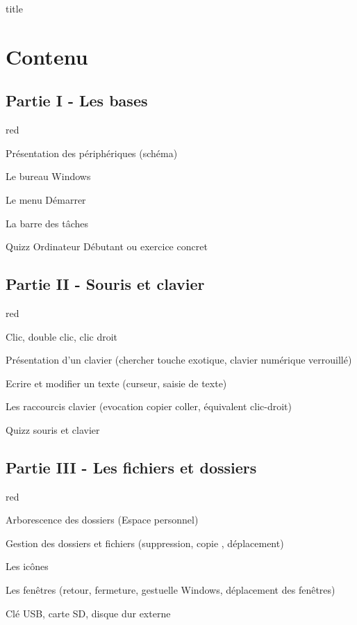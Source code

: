 {\begin{graphic3D}{title}
\end{graphic3D}\chapter{Contenu}

\section{Partie I - Les bases}

\begin{items}{red}{\Circle}
\item Présentation des périphériques (schéma)
\item Le bureau Windows
\item Le menu Démarrer
\item La barre des tâches
\item Quizz Ordinateur Débutant ou exercice concret
\end{items}



\section{Partie II - Souris et clavier}

\begin{items}{red}{\Circle}
\item Clic, double clic, clic droit
\item Présentation d’un clavier (chercher touche exotique, clavier numérique verrouillé)
\item Ecrire et modifier un texte (curseur, saisie de texte)
\item Les raccourcis clavier (evocation copier coller, équivalent clic-droit)



\item Quizz souris et clavier
\end{items}


\section{Partie III - Les fichiers et dossiers}

\begin{items}{red}{\Circle}
 \item Arborescence des dossiers (Espace personnel) 
 \item Gestion des dossiers et fichiers (suppression, copie , déplacement)
\item Les icônes
\item Les fenêtres (retour, fermeture, gestuelle Windows, déplacement des fenêtres)
\item Clé USB, carte SD, disque dur externe
\end{items}



}
